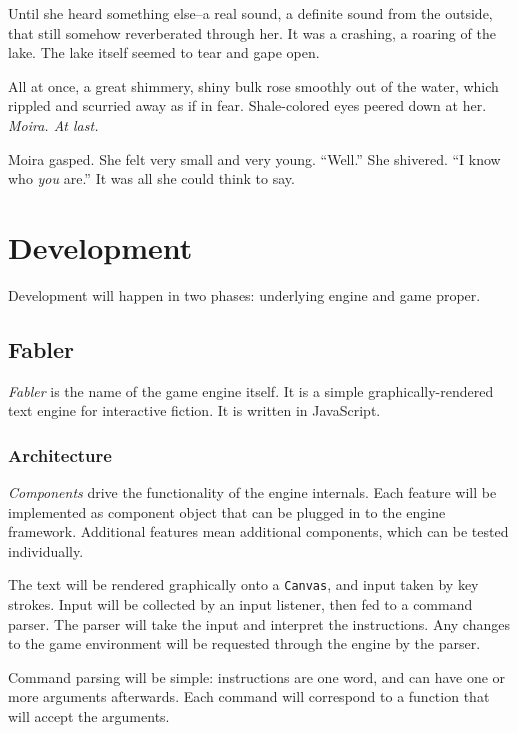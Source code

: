 \documentclass[letterpaper, twoside, 12pt]{memoir}
\begin{document}
Until she heard something else--a real sound, a definite sound from the outside, that still somehow reverberated through her. It was a crashing, a roaring of the lake. The lake itself seemed to tear and gape open.

All at once, a great shimmery, shiny bulk rose smoothly out of the water, which rippled and scurried away as if in fear. Shale-colored eyes peered down at her.
\textit{Moira. At last.}

Moira gasped. She felt very small and very young. 
“Well.” She shivered. “I know who \textit{you} are.” It was all she could think to say.


\chapter{Development}

Development will happen in two phases: underlying engine and game proper.

\section{Fabler}

\textit{Fabler} is the name of the game engine itself. It is a simple graphically-rendered text engine for interactive fiction. It is written in JavaScript. 

\subsection{Architecture}

\textit{Components} drive the functionality of the engine internals. Each feature will be implemented as component object that can be plugged in to the engine framework. Additional features mean additional components, which can be tested individually.

The text will be rendered graphically onto a \texttt{Canvas}, and input taken by key strokes. Input will be collected by an input listener, then fed to a command parser. The parser will take the input and interpret the instructions. Any changes to the game environment will be requested through the engine by the parser. 

Command parsing will be simple: instructions are one word, and can have one or more arguments afterwards. Each command will correspond to a function that will accept the arguments. 
\end{document}
